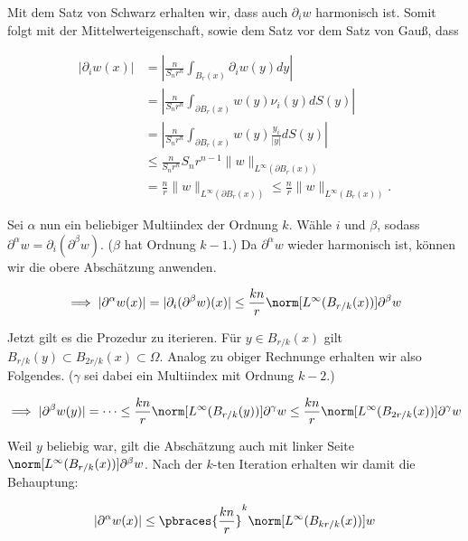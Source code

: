 \begin{solution}

Mit dem Satz von Schwarz erhalten wir, dass auch $\partial_i w$ harmonisch ist.
Somit folgt mit der Mittelwerteigenschaft, sowie dem Satz vor dem Satz von Gauß, dass

\begin{align*}
  |\partial_iw(x)|
  & =
  \left|\frac{n}{S_nr^n}\int_{B_{r}(x)}\partial_iw(y) dy\right| \\
  & =
  \left|\frac{n}{S_nr^n}\int_{\partial B_{r}(x)}w(y)\nu_i(y) dS(y)\right| \\
  & =
  \left|\frac{n}{S_nr^n}\int_{\partial B_{r}(x)}w(y)\frac{y_i}{|y|} dS(y)\right| \\
  & \leq
  \frac{n}{S_nr^n}S_nr^{n-1}\|w\|_{L^\infty(\partial B_{r}(x))} \\
  & =
  \frac{n}{r}\|w\|_{L^\infty(\partial B_{r}(x))} \leq \frac{n}{r}\|w\|_{L^\infty(B_{r}(x))}.
\end{align*}

Sei $\alpha$ nun ein beliebiger Multiindex der Ordnung $k$.
Wähle $i$ und $\beta$, sodass $\partial^\alpha w = \partial_i(\partial^\beta w)$.
($\beta$ hat Ordnung $k-1$.)
Da $\partial^\alpha w$ wieder harmonisch ist, können wir die obere Abschätzung anwenden.

\begin{align*}
  \implies
  |\partial^\alpha w(x)|
  =
  |\partial_i (\partial^\beta w)(x)|
  \leq
  \frac{kn}{r}
  \norm
  [
    L^\infty( B_{r/k}(x))
  ]
  {\partial^\beta w}
\end{align*}

Jetzt gilt es die Prozedur zu iterieren.
Für $y \in B_{r/k}(x)$ gilt $B_{r/k}(y) \subset B_{2r/k}(x) \subset \Omega$.
Analog zu obiger Rechnunge erhalten wir also Folgendes.
($\gamma$ sei dabei ein Multiindex mit Ordnung $k-2$.)

\begin{align*}
  \implies
  |\partial^\beta w(y)|
  =
  \cdots
  \leq
  \frac{kn}{r}
  \norm
  [
    L^\infty(B_{r/k}(y))
  ]
  {\partial^\gamma w}
  \leq
  \frac{kn}{r}
  \norm
  [
    L^\infty(B_{2r/k}(x))
  ]
  {\partial^\gamma w}
\end{align*}

Weil $y$ beliebig war, gilt die Abschätzung auch mit linker Seite $\norm[L^\infty( B_{r/k}(x))]{\partial^\beta w}$.
Nach der $k$-ten Iteration erhalten wir damit die Behauptung:

\begin{align*}
  |\partial^\alpha w(x)|
  \leq
  \pbraces
  {
      \frac{kn}{r}
  }^k
  \norm[L^\infty(B_{kr/k}(x))]{w}
\end{align*}

\end{solution}

